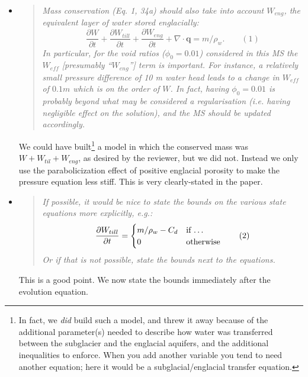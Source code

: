 \documentclass[11pt,reqno]{amsart}
\newcommand{\reply}[2]{
\medskip\medskip
\item  \begin{quote}
\emph{#1}
\end{quote}

\medskip
\noindent #2}
\begin{document}
\begin{itemize}
\reply{Mass conservation (Eq. 1, 34a) should also take into account $W_{eng}$, the equivalent layer of water stored englacially:
   $$\frac{\partial W}{\partial t} + \frac{\partial W_{till}}{\partial t} + \frac{\partial W_{eng}}{\partial t} + \nabla \cdot \mathbf{q} = m /\rho_w. \qquad (1)$$
In particular, for the void ratios ($\phi_0 = 0.01$) considered in this MS the $W_{eff}$ [presumably ``$W_{eng}$''] term is important.  For instance, a relatively small pressure difference of 10 m water head leads to a change in $W_{eff}$ of $0.1 m$ which is on the order of $W$. In fact, having $\phi_0 = 0.01$ is probably beyond what may be considered a regularisation (i.e. having negligible effect on the solution), and the MS should be updated accordingly.}
{We could have built\footnote{In fact, we \emph{did} build such a model, and threw it away because of the additional parameter(s) needed to describe how water was transferred between the subglacier and the englacial aquifers, and the additional inequalities to enforce.  When you add another variable you tend to need another equation; here it would be a subglacial/englacial transfer equation.} a model in which the conserved mass was $W+W_{til}+W_{eng}$, as desired by the reviewer, but we did not.  Instead we only use the parabolicization effect of positive englacial porosity to make the pressure equation less stiff.  This is very clearly-stated in the paper.}

\reply{If possible, it would be nice to state the bounds on the various state equations more explicitly, e.g.:
  $$\frac{\partial W_{till}}{\partial t} = \begin{cases} m /\rho_w - C_d & \text{if \dots} \\  0 & \text{otherwise}  \end{cases} \qquad (2)$$
Or if that is not possible, state the bounds next to the equations.}
{This is a good point.  We now state the bounds immediately after the evolution equation.}


\end{itemize}
\end{document}
